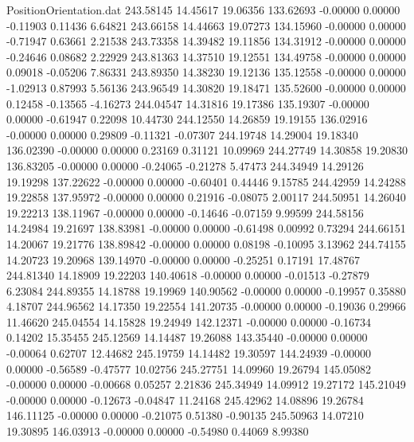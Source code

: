\begin{filecontents}{PositionOrientation.dat}
 243.58145   14.45617   19.06356   133.62693   -0.00000    0.00000   -0.11903    0.11436    6.64821
 243.66158   14.44663   19.07273   134.15960   -0.00000    0.00000   -0.71947    0.63661    2.21538
 243.73358   14.39482   19.11856   134.31912   -0.00000    0.00000   -0.24646    0.08682    2.22929
 243.81363   14.37510   19.12551   134.49758   -0.00000    0.00000    0.09018   -0.05206    7.86331
 243.89350   14.38230   19.12136   135.12558   -0.00000    0.00000   -1.02913    0.87993    5.56136
 243.96549   14.30820   19.18471   135.52600   -0.00000    0.00000    0.12458   -0.13565   -4.16273
 244.04547   14.31816   19.17386   135.19307   -0.00000    0.00000   -0.61947    0.22098   10.44730
 244.12550   14.26859   19.19155   136.02916   -0.00000    0.00000    0.29809   -0.11321   -0.07307
 244.19748   14.29004   19.18340   136.02390   -0.00000    0.00000    0.23169    0.31121   10.09969
 244.27749   14.30858   19.20830   136.83205   -0.00000    0.00000   -0.24065   -0.21278    5.47473
 244.34949   14.29126   19.19298   137.22622   -0.00000    0.00000   -0.60401    0.44446    9.15785
 244.42959   14.24288   19.22858   137.95972   -0.00000    0.00000    0.21916   -0.08075    2.00117
 244.50951   14.26040   19.22213   138.11967   -0.00000    0.00000   -0.14646   -0.07159    9.99599
 244.58156   14.24984   19.21697   138.83981   -0.00000    0.00000   -0.61498    0.00992    0.73294
 244.66151   14.20067   19.21776   138.89842   -0.00000    0.00000    0.08198   -0.10095    3.13962
 244.74155   14.20723   19.20968   139.14970   -0.00000    0.00000   -0.25251    0.17191   17.48767
 244.81340   14.18909   19.22203   140.40618   -0.00000    0.00000   -0.01513   -0.27879    6.23084
 244.89355   14.18788   19.19969   140.90562   -0.00000    0.00000   -0.19957    0.35880    4.18707
 244.96562   14.17350   19.22554   141.20735   -0.00000    0.00000   -0.19036    0.29966   11.46620
 245.04554   14.15828   19.24949   142.12371   -0.00000    0.00000   -0.16734    0.14202   15.35455
 245.12569   14.14487   19.26088   143.35440   -0.00000    0.00000   -0.00064    0.62707   12.44682
 245.19759   14.14482   19.30597   144.24939   -0.00000    0.00000   -0.56589   -0.47577   10.02756
 245.27751   14.09960   19.26794   145.05082   -0.00000    0.00000   -0.00668    0.05257    2.21836
 245.34949   14.09912   19.27172   145.21049   -0.00000    0.00000   -0.12673   -0.04847   11.24168
 245.42962   14.08896   19.26784   146.11125   -0.00000    0.00000   -0.21075    0.51380   -0.90135
 245.50963   14.07210   19.30895   146.03913   -0.00000    0.00000   -0.54980    0.44069    8.99380

\end{filecontents}
